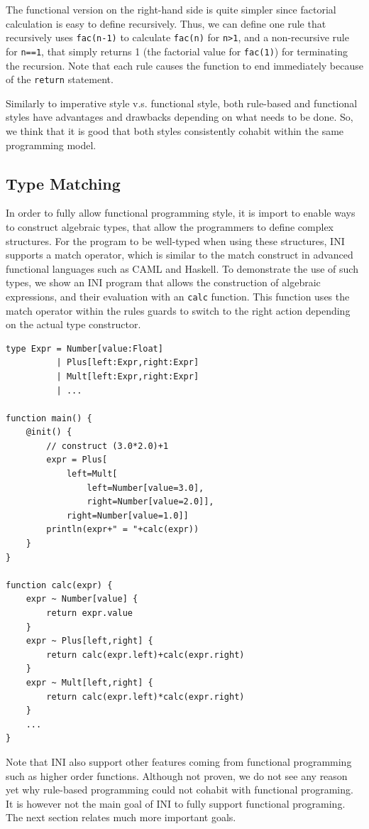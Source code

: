 \documentclass{sig-alternate}
\begin{document}
The functional version on the right-hand side is quite simpler since factorial calculation is easy to define recursively. Thus, we can define one rule that recursively uses \texttt{fac(n-1)} to calculate \texttt{fac(n)} for \texttt{n>1}, and a non-recursive rule for \texttt{n==1}, that simply returns 1 (the factorial value for \texttt{fac(1)}) for terminating the recursion. Note that each rule causes the function to end immediately because of the \texttt{return} statement.

Similarly to imperative style v.s. functional style, both rule-based and functional styles have advantages and drawbacks depending on what needs to be done. So, we think that it is good that both styles consistently cohabit within the same programming model. 

\subsection{Type Matching\label{subsec:type_matching}}

In order to fully allow functional programming style, it is import to enable ways to construct algebraic types, that allow the programmers to define complex structures. For the program to be well-typed when using these structures, INI supports a match operator, which is similar to the match construct in advanced functional languages such as CAML and Haskell. To demonstrate the use of such types, we show an INI program that allows the construction of algebraic expressions, and their evaluation with an \texttt{calc} function. This function uses the match operator within the rules guards to switch to the right action depending on the actual type constructor. 

\begin{lstlisting}
type Expr = Number[value:Float]
          | Plus[left:Expr,right:Expr]
          | Mult[left:Expr,right:Expr]
          | ...

function main() {
	@init() {
		// construct (3.0*2.0)+1
		expr = Plus[
			left=Mult[
				left=Number[value=3.0],
				right=Number[value=2.0]],
			right=Number[value=1.0]]
		println(expr+" = "+calc(expr))
	}
}

function calc(expr) {
	expr ~ Number[value] {
		return expr.value
	}
	expr ~ Plus[left,right] {
		return calc(expr.left)+calc(expr.right)
	}
	expr ~ Mult[left,right] {
		return calc(expr.left)*calc(expr.right)
	}
	...
}
\end{lstlisting}

Note that INI also support other features coming from functional programming such as higher order functions. Although not proven, we do not see any reason yet why rule-based programming could not cohabit with functional programing. It is however not the main goal of INI to fully support functional programing. The next section relates much more important goals.
\end{document}
